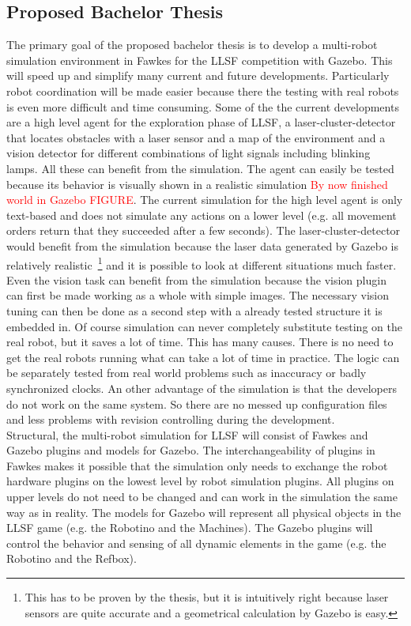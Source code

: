 \documentclass[11pt,a4paper,titlepage]{article}
\begin{document}
\subsection{Proposed Bachelor Thesis}
The primary goal of the proposed bachelor thesis is to develop a multi-robot simulation environment in Fawkes for the LLSF competition with Gazebo. This will speed up and simplify many current and future developments. Particularly robot coordination will be made easier because there the testing with real robots is even more difficult and time consuming. Some of the the current developments are a high level agent for the exploration phase of LLSF, a laser-cluster-detector that locates obstacles with a laser sensor and a map of the environment and a vision detector for different combinations of light signals including blinking lamps. All these can benefit from the simulation. The agent can easily be tested because its behavior is visually shown in  a realistic simulation \textcolor{red}{By now finished world in Gazebo FIGURE}. The current simulation for the high level agent is only text-based and does not simulate any actions on a lower level (e.g. all movement orders return that they succeeded after a few seconds). The laser-cluster-detector would benefit from the simulation because the laser data generated by Gazebo is relatively realistic~\footnote{This has to be proven by the thesis, but it is intuitively right because laser sensors are quite accurate and a geometrical calculation by Gazebo is easy.} and it is possible to look at different situations much faster. Even the vision task can benefit from the simulation because the vision plugin can first be made working as a whole with simple images. The necessary vision tuning can then be done as a second step with a already tested structure it is embedded in. Of course simulation can never completely substitute testing on the real robot, but it saves a lot of time. This has many causes. There is no need to get the real robots running what can take a lot of time in practice. The logic can be separately tested from real world problems such as inaccuracy or badly synchronized clocks. An other advantage of the simulation is that the developers do not work on the same system. So there are no messed up configuration files and less problems with revision controlling during the development.\\
Structural, the multi-robot simulation for LLSF will consist of Fawkes and Gazebo plugins and models for Gazebo. The interchangeability of plugins in Fawkes makes it possible that the simulation only needs to exchange the robot hardware plugins on the lowest level by robot simulation plugins. All plugins on upper levels do not need to be changed and can work in the simulation the same way as in reality. The models for Gazebo will represent all physical objects in the LLSF game (e.g. the Robotino and the Machines). The Gazebo plugins will control the behavior and sensing of all dynamic elements in the game (e.g. the Robotino and the Refbox).\\
\end{document}
